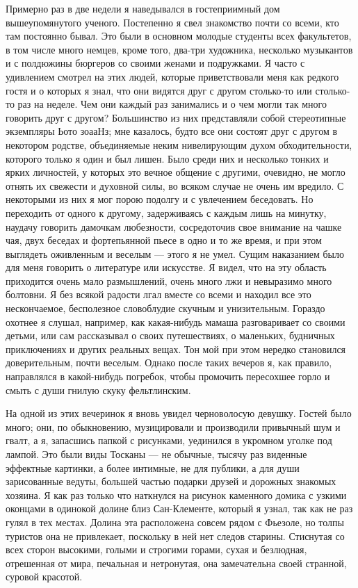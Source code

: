 Примерно  раз  в   две  недели  я  наведывался   в  гостеприимный  дом
вышеупомянутого ученого. Постепенно я  свел знакомство почти со всеми,
кто там  постоянно бывал.  Это были в  основном молодые  студенты всех
факультетов, в том числе много  немцев, кроме того, два-три художника,
несколько  музыкантов  и  с  полдюжины бюргеров  со  своими  женами  и
подружками.  Я  часто с  удивлением  смотрел  на этих  людей,  которые
приветствовали меня  как редкого  гостя и  о которых  я знал,  что они
видятся  друг  с  другом  столько-то или  столько-то  раз  на  неделе.
Чем  они каждый  раз  занимались  и о  чем  могли  так много  говорить
друг  с другом?  Большинство  из них  представляли собой  стереотипные
экземпляры Ьото  зоааНз; мне  казалось, будто все  они состоят  друг с
другом  в некотором  родстве,  объединяемые  неким нивелирующим  духом
обходительности, которого только я один и  был лишен. Было среди них и
несколько тонких  и ярких  личностей, у которых  это вечное  общение с
другими, очевидно,  не могло  отнять их свежести  и духовной  силы, во
всяком случае  не очень им  вредило. С некоторыми  из них я  мог порою
подолгу и с увлечением беседовать.  Но переходить от одного к другому,
задерживаясь  с  каждым лишь  на  минутку,  наудачу говорить  дамочкам
любезности, сосредоточив  свое внимание на  чашке чая, двух  беседах и
фортепьянной  пьесе  в одно  и  то  же  время,  и при  этом  выглядеть
оживленным и  веселым --- этого я  не умел. Сущим наказанием  было для
меня говорить о литературе или искусстве.  Я видел, что на эту область
приходится очень мало размышлений, очень  много лжи и невыразимо много
болтовни. Я без всякой радости лгал  вместе со всеми и находил все это
нескончаемое, бесполезное словоблудие  скучным и унизительным. Гораздо
охотнее я  слушал, например, как какая-нибудь  мамаша разговаривает со
своими детьми, или сам рассказывал  о своих путешествиях, о маленьких,
будничных  приключениях и  других  реальных вещах.  Тон  мой при  этом
нередко становился  доверительным, почти  веселым. Однако  после таких
вечеров  я, как  правило, направлялся  в какой-нибудь  погребок, чтобы
промочить пересохшее горло и смыть с души гнилую скуку фельтлинским.

На одной из этих вечеринок я вновь увидел черноволосую девушку. Гостей
было много; они, по  обыкновению, музицировали и производили привычный
шум и гвалт,  а я, запасшись папкой с рисунками,  уединился в укромном
уголке под  лампой. Это были виды  Тосканы --- не обычные,  тысячу раз
виденные эффектные картинки,  а более интимные, не для  публики, а для
души  зарисованные ведуты,  большей частью  подарки друзей  и дорожных
знакомых хозяина. Я как раз  только что наткнулся на рисунок каменного
домика с узкими оконцами в  одинокой долине близ Сан-Клементе, который
я узнал,  так как не  раз гулял в  тех местах. Долина  эта расположена
совсем рядом с Фьезоле, но толпы туристов она не привлекает, поскольку
в ней нет следов старины. Стиснутая  со всех сторон высокими, голыми и
строгими горами,  сухая и безлюдная,  отрешенная от мира,  печальная и
нетронутая, она замечательна своей странной, суровой красотой.

